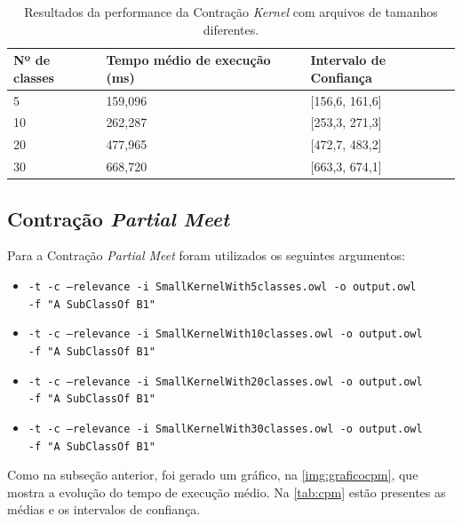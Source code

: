 \begin{table}[H]
	\centering
	\begin{tabular}{|l|l|l|}
		\hline
		\textbf{Nº de classes}  & \textbf{Tempo médio de execução (ms)} & \textbf{Intervalo de Confiança} \\ \hline
		5                                                 & 159,096                          & {[}156,6, 161,6{]}              \\ \hline
		10                                                & 262,287                          & {[}253,3, 271,3{]}              \\ \hline
		20                                                & 477,965                          & {[}472,7, 483,2{]}              \\ \hline
		30                                                & 668,720                          & {[}663,3, 674,1{]}              \\ \hline
	\end{tabular}
	\caption{Resultados da performance da Contração \textit{Kernel} com arquivos de tamanhos diferentes.}
	\label{tab:ck}
\end{table}

\subsection{Contração \textit{Partial Meet}}

Para a Contração \textit{Partial Meet} foram utilizados os seguintes argumentos:

\begin{itemize}
	\item \texttt{-t -c --relevance -i SmallKernelWith5classes.owl -o output.owl \\ -f "A SubClassOf B1"}
	\item \texttt{-t -c --relevance -i SmallKernelWith10classes.owl -o output.owl \\ -f "A SubClassOf B1"}
	\item \texttt{-t -c --relevance -i SmallKernelWith20classes.owl -o output.owl \\ -f "A SubClassOf B1"}
	\item \texttt{-t -c --relevance -i SmallKernelWith30classes.owl -o output.owl \\ -f "A SubClassOf B1"}
\end{itemize}

Como na subseção anterior, foi gerado um gráfico, na \autoref{img:graficocpm}, que mostra a evolução do tempo de execução médio. Na \autoref{tab:cpm} estão presentes as médias e os intervalos de confiança.

